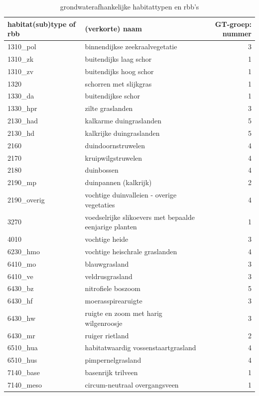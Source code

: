\documentclass[11pt,]{book}
\begin{document}
\begin{table}

\caption{\label{tab:gw-typen}grondwaterafhankelijke habitattypen en rbb's}
\centering
\begin{tabular}[t]{l|l|r}
\hline
habitat(sub)type of rbb & (verkorte) naam & GT-groep: nummer\\
\hline
1310\_pol & binnendijkse zeekraalvegetatie & 3\\
\hline
1310\_zk & buitendijks laag schor & 1\\
\hline
1310\_zv & buitendijks hoog schor & 1\\
\hline
1320 & schorren met slijkgras & 1\\
\hline
1330\_da & buitendijkse schor & 1\\
\hline
1330\_hpr & zilte graslanden & 3\\
\hline
2130\_had & kalkarme duingraslanden & 5\\
\hline
2130\_hd & kalkrijke duingraslanden & 5\\
\hline
2160 & duindoornstruwelen & 4\\
\hline
2170 & kruipwilgstruwelen & 4\\
\hline
2180 & duinbossen & 4\\
\hline
2190\_mp & duinpannen (kalkrijk) & 2\\
\hline
2190\_overig & vochtige duinvalleien - overige vegetaties & 4\\
\hline
3270 & voedselrijke slikoevers met bepaalde eenjarige planten & 1\\
\hline
4010 & vochtige heide & 3\\
\hline
6230\_hmo & vochtige heischrale graslanden & 4\\
\hline
6410\_mo & blauwgrasland & 3\\
\hline
6410\_ve & veldrusgrasland & 3\\
\hline
6430\_bz & nitrofiele boszoom & 5\\
\hline
6430\_hf & moerasspirearuigte & 3\\
\hline
6430\_hw & ruigte en zoom met harig wilgenroosje & 3\\
\hline
6430\_mr & ruiger rietland & 2\\
\hline
6510\_hua & habitatwaardig vossenstaartgrasland & 4\\
\hline
6510\_hus & pimpernelgrasland & 4\\
\hline
7140\_base & basenrijk trilveen & 1\\
\hline
7140\_meso & circum-neutraal overgangsveen & 1\\

\end{tabular}
\end{table}
\end{document}
